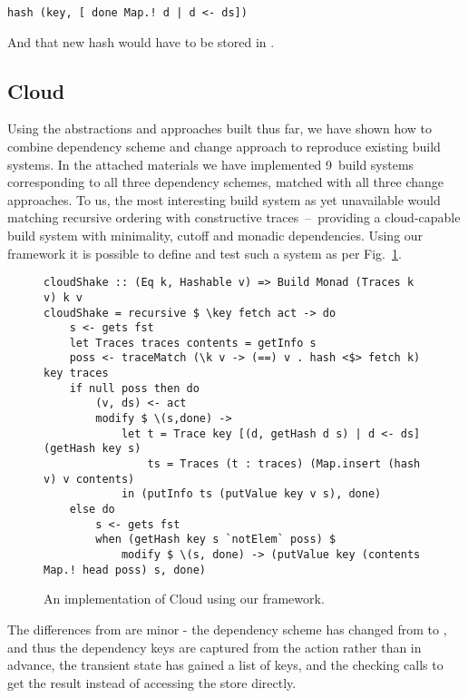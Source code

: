 \begin{verbatim}
hash (key, [ done Map.! d | d <- ds])
\end{verbatim}

\noindent
And that new hash would have to be stored in .

\subsection{Cloud \Shake}\label{sec-implementation-cloud-shake}

Using the abstractions and approaches built thus far, we have shown how to combine dependency scheme and change approach to reproduce existing build systems. In the attached materials we have implemented 9~build systems corresponding to all three dependency schemes, matched with all three change approaches. To us, the most interesting build system as yet unavailable would matching recursive ordering with constructive traces~--~providing a cloud-capable build system with minimality, cutoff and monadic dependencies. Using our framework it is possible to define and test such a system as per Fig.~\ref{fig-cloudshake-implementation}.

\begin{figure}
\begin{verbatim}
cloudShake :: (Eq k, Hashable v) => Build Monad (Traces k v) k v
cloudShake = recursive $ \key fetch act -> do
    s <- gets fst
    let Traces traces contents = getInfo s
    poss <- traceMatch (\k v -> (==) v . hash <$> fetch k) key traces
    if null poss then do
        (v, ds) <- act
        modify $ \(s,done) ->
            let t = Trace key [(d, getHash d s) | d <- ds] (getHash key s)
                ts = Traces (t : traces) (Map.insert (hash v) v contents)
            in (putInfo ts (putValue key v s), done)
    else do
        s <- gets fst
        when (getHash key s `notElem` poss) $
            modify $ \(s, done) -> (putValue key (contents Map.! head poss) s, done)
\end{verbatim}
\vspace{-2mm}
\caption{An implementation of Cloud \Shake using our framework.}\label{fig-cloudshake-implementation}
\vspace{-2mm}
\end{figure}

The differences from  are minor - the dependency scheme has changed from  to , and thus the dependency keys  are captured from the action rather than in advance, the transient state has gained a list of keys, and the checking calls  to get the result instead of accessing the store directly.

